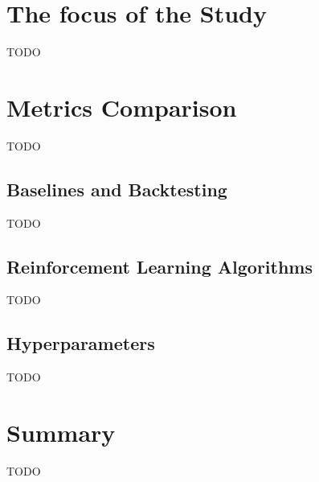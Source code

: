 \documentclass[../xlapes02]{subfiles}
\begin{document}
    \section{The focus of the Study}\label{sec:the-focus-of-the-study}
    TODO


    \section{Metrics Comparison}\label{sec:metrics-comparison}
    TODO

    \subsection{Baselines and Backtesting}\label{subsec:baselines-and-backtesting}
    TODO
%
%

    \subsection{Reinforcement Learning Algorithms}\label{subsec:rl-algorithms}
    TODO

    \subsection{Hyperparameters}\label{subsec:hyperparameters}
    TODO


    \section{Summary}\label{sec:summary}
    TODO
\end{document}
